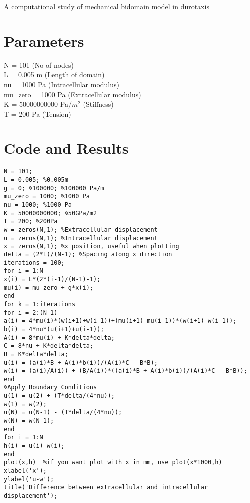 \documentclass[11pt]{article}
\newcommand{\soptitle}{A computational study of mechanical bidomain model in durotaxis}
\begin{document}
	
	\begin{center}
		\Large\soptitle
	\end{center}

\section*{Parameters}
N = 101 (No of nodes) \\
L = 0.005 m (Length of domain) \\
nu = 1000 Pa (Intracellular modulus) \\
mu\_zero = 1000 Pa (Extracellular modulus) \\
K = 50000000000 Pa/$m^{2}$ (Stiffness) \\
T =  200 Pa (Tension) \\
\section*{Code and Results}
\begin{lstlisting}
N = 101;
L = 0.005; %0.005m
g = 0; %100000; %100000 Pa/m
mu_zero = 1000; %1000 Pa
nu = 1000; %1000 Pa
K = 50000000000; %50GPa/m2
T = 200; %200Pa
w = zeros(N,1); %Extracellular displacement
u = zeros(N,1); %Intracellular displacement
x = zeros(N,1); %x position, useful when plotting
delta = (2*L)/(N-1); %Spacing along x direction
iterations = 100;
for i = 1:N
x(i) = L*(2*(i-1)/(N-1)-1); 
mu(i) = mu_zero + g*x(i);
end
for k = 1:iterations
for i = 2:(N-1)
a(i) = 4*mu(i)*(w(i+1)+w(i-1))+(mu(i+1)-mu(i-1))*(w(i+1)-w(i-1));
b(i) = 4*nu*(u(i+1)+u(i-1));
A(i) = 8*mu(i) + K*delta*delta;
C = 8*nu + K*delta*delta;
B = K*delta*delta;
u(i) = (a(i)*B + A(i)*b(i))/(A(i)*C - B*B);
w(i) = (a(i)/A(i)) + (B/A(i))*((a(i)*B + A(i)*b(i))/(A(i)*C - B*B));
end
%Apply Boundary Conditions
u(1) = u(2) + (T*delta/(4*nu));
w(1) = w(2);
u(N) = u(N-1) - (T*delta/(4*nu));
w(N) = w(N-1);
end 
for i = 1:N
h(i) = u(i)-w(i);
end 
plot(x,h)  %if you want plot with x in mm, use plot(x*1000,h)
xlabel('x');
ylabel('u-w');
title('Difference between extracellular and intracellular displacement');
\end{lstlisting}
\end{document}
